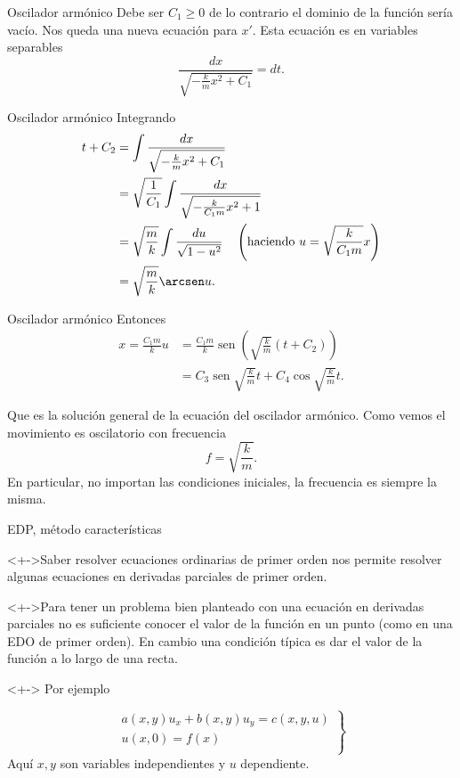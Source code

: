\documentclass{article}
\DeclareMathOperator{\sen}{sen}
\begin{document}
{Oscilador armónico}
Debe ser $C_1\geq 0$ de lo contrario el dominio de la función sería vacío. Nos queda una nueva ecuación para $x'$.
Esta ecuación es en variables separables
\[ \frac{dx}{\sqrt{-\frac{k}{m}x^2+C_1}}=dt.   
\]



{Oscilador armónico}
 Integrando
\[\begin{split}
   t+C_2 
   &=\int \frac{dx}{\sqrt{-\frac{k}{m}x^2+C_1}}\\
   &= \sqrt{\frac{1}{C_1}} \int \frac{dx}{\sqrt{-\frac{k}{C_1m}x^2+1}} \\  
   &= \sqrt{\frac{m}{k}} \int \frac{du}{\sqrt{1-u^2}}\quad \left(\text{haciendo } u=\sqrt{\frac{k}{C_1m}}x\right)\\ 
   &=\sqrt{\frac{m}{k}}\arcsen u.
  \end{split}
\]


{Oscilador armónico}
Entonces
\[\begin{split}
    x=\frac{C_1m}{k}u &=\frac{C_1m}{k}\sen \left(\sqrt{\frac{k}{m}}(t+C_2)\right)\\
    &=\boxed{C_3\sen \sqrt{\frac{k}{m}}t+C_4\cos \sqrt{\frac{k}{m}}t}.
  \end{split}
 \]

Que es la solución general de la ecuación del oscilador armónico. Como vemos el movimiento es oscilatorio con frecuencia
\[\boxed{f=\sqrt{\frac{k}{m}} }.\]
En particular, no importan las condiciones iniciales, la frecuencia es siempre la misma. 

 
 



{EDP, método características}

<+->Saber resolver ecuaciones ordinarias de primer orden nos permite resolver algunas ecuaciones en derivadas parciales de primer orden. 

<+->Para tener un problema bien planteado con una ecuación en derivadas parciales no es suficiente conocer el valor de la función en un punto (como en una EDO de primer orden). En cambio una condición típica es dar el valor de la función a lo largo de una recta. 

<+-> Por ejemplo

\begin{equation}\label{eq:EDP_gral_1orden}
  \left.\begin{array}{l}
  a(x,y)u_x+b(x,y)u_y=c(x,y,u)\\
  u(x,0)=f(x)\\
\end{array}\right\}
\end{equation}
Aquí $x,y$ son variables independientes y $u$ dependiente.
\end{document}
